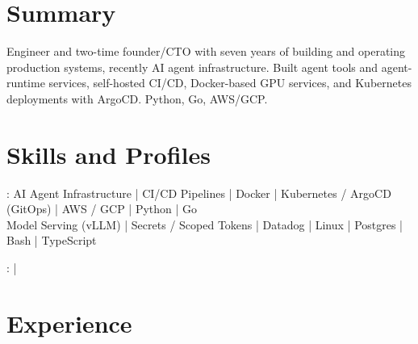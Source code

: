 \documentclass[print]{jack-resume}
\begin{document}
\pagecolor{darkmodeBackground}


\begin{minipage}[t][1cm][t]{.03\textwidth}
    \hfill
\end{minipage}

\section{Summary}
Engineer and two-time founder/CTO with seven years of building and operating production systems, recently AI agent infrastructure. Built agent tools and agent-runtime services, self-hosted CI/CD, Docker-based GPU services, and Kubernetes deployments with ArgoCD. Python, Go, AWS/GCP.
\sectionsep

\section{Skills and Profiles}
:
AI Agent Infrastructure \hfill | \hfill
CI/CD Pipelines \hfill | \hfill
Docker \hfill | \hfill
Kubernetes / ArgoCD (GitOps) \hfill | \hfill
AWS / GCP \hfill | \hfill
Python \hfill | \hfill
Go \\
\hspace{1.0cm} Model Serving (vLLM) \hfill | \hfill
Secrets / Scoped Tokens \hfill | \hfill
Datadog \hfill | \hfill
Linux \hfill | \hfill
Postgres \hfill | \hfill
Bash \hfill | \hfill
TypeScript \\

\raggedright{
    :
      \href{https://www.linkedin.com/in/jack-sturtevant/}{ \ExternalLink} |
     \href{https://github.com/jacksturt}{ \ExternalLink}}

\section{Experience}
\end{document}
